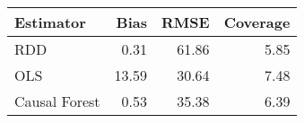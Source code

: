 \begin{table}[ht]
\centering
\begin{tabular}{lrrr}
  \hline
Estimator & Bias & RMSE & Coverage \\ 
  \hline
RDD & 0.31 & 61.86 & 5.85 \\ 
  OLS & 13.59 & 30.64 & 7.48 \\ 
  Causal Forest & 0.53 & 35.38 & 6.39 \\ 
   \hline
\end{tabular}
\caption{} 
\end{table}
